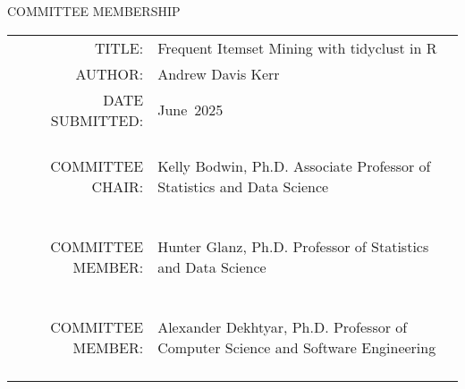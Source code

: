 \begin{center}
COMMITTEE MEMBERSHIP
\end{center}
\par
\vspace*{0.5in}

\begin{tabular}{rp{3.7in}}
TITLE:  &Frequent Itemset Mining with tidyclust in R     \par\\
AUTHOR: &Andrew Davis Kerr     \par\\
DATE SUBMITTED: &June~2025  \par\\

\vspace*{0.5in} \\

COMMITTEE CHAIR:  &\begin{minipage}[t]{3.7in}\linespread{1.5}\selectfont{}\begin{flushleft}Kelly Bodwin, Ph.D. \linebreak Associate Professor of Statistics and Data Science\end{flushleft}\end{minipage}  \\\\
COMMITTEE MEMBER: &\begin{minipage}[t]{3.7in}\linespread{1.5}\selectfont{}\begin{flushleft}Hunter Glanz, Ph.D. \linebreak Professor of Statistics and Data Science\end{flushleft}\end{minipage}     \\\\
COMMITTEE MEMBER: &\begin{minipage}[t]{3.7in}\linespread{1.5}\selectfont{}\begin{flushleft}Alexander Dekhtyar, Ph.D. \linebreak Professor of Computer Science and Software Engineering\end{flushleft}\end{minipage}     \\\\

\end{tabular}

\newpage